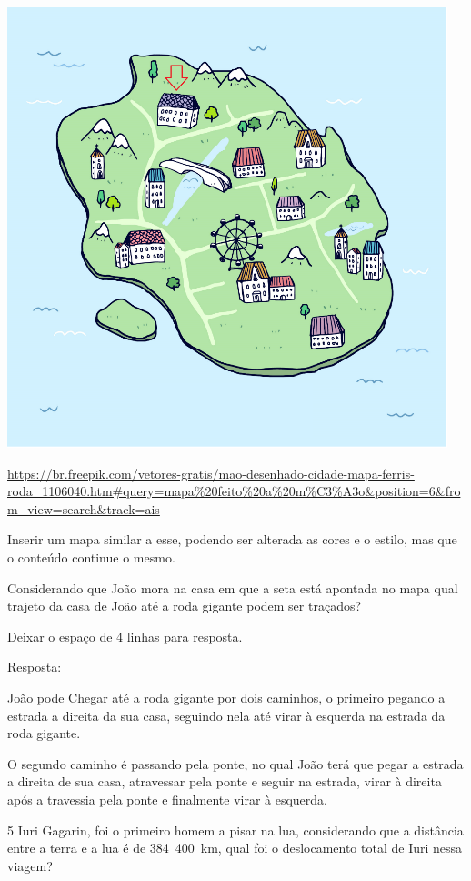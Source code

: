 \includegraphics[width=2\times 2in,height=2\times 2in]{./imgSAEB_8_MAT/media/image38.png}

\url{https://br.freepik.com/vetores-gratis/mao-desenhado-cidade-mapa-ferris-roda_1106040.htm\#query=mapa\%20feito\%20a\%20m\%C3\%A3o\&position=6\&from_view=search\&track=ais}

Inserir um mapa similar a esse, podendo ser alterada as cores e o
estilo, mas que o conteúdo continue o mesmo.

Considerando que João mora na casa em que a seta está apontada no mapa
qual trajeto da casa de João até a roda gigante podem ser traçados?

Deixar o espaço de 4 linhas para resposta.

Resposta:

João pode Chegar até a roda gigante por dois caminhos, o primeiro
pegando a estrada a direita da sua casa, seguindo nela até virar à
esquerda na estrada da roda gigante.

O segundo caminho é passando pela ponte, no qual João terá que pegar a
estrada a direita de sua casa, atravessar pela ponte e seguir na
estrada, virar à direita após a travessia pela ponte e finalmente virar
à esquerda.

\num{5} Iuri Gagarin, foi o primeiro homem a pisar na lua, considerando que a
distância entre a terra e a lua é de 384~400~km, qual foi o deslocamento
total de Iuri nessa viagem?

